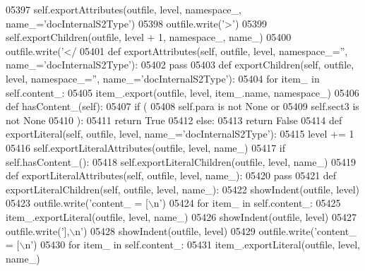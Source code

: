 \begin{DoxyCode}
{{{{{{{{{{{{{{{{{{{{{{{{{{{{{{{{{{{{{{{{{{{{{{{{{{{{{{{{{{{{{{{{{{{{{{{{{{{{{{{{{{{{{{{{{{{{{{{{{{{{{{{{{{{{{{{{{{{{{{{{{{{{{{{{{{{{{{{{{{{{{{{{{{{{{{{{{{{{{{{{{{{{{{{{{{{{{{{{{{{{{{{{{{{{{{{{{{{{{{{{{{{{{{{{{{{{{{{{{{{{{{{{{{{{{{{{{{{{{{{{{{{{{{{{{{{{{{{{{{{{{{{{{{{{{{{{{{{{{{{{{{{{{{{{{{{{{{{{{{{{{{{{{{{{{{{{{{{{{{{{{{{{{{{{{{{{{{{{{{{{{05397         self.exportAttributes(outfile, level, namespace\_, name\_=\textcolor{stringliteral}{'docInternalS2Type'})
05398         outfile.write(\textcolor{stringliteral}{'>'})
05399         self.exportChildren(outfile, level + 1, namespace\_, name\_)
05400         outfile.write(\textcolor{stringliteral}{'</%
05401     \textcolor{keyword}{def }exportAttributes(self, outfile, level, namespace\_='', name\_='docInternalS2Type'):
05402         \textcolor{keywordflow}{pass}
05403     \textcolor{keyword}{def }exportChildren(self, outfile, level, namespace\_='', name\_='docInternalS2Type'):
05404         \textcolor{keywordflow}{for} item\_ \textcolor{keywordflow}{in} self.content\_:
05405             item\_.export(outfile, level, item\_.name, namespace\_)
05406     \textcolor{keyword}{def }hasContent_(self):
05407         \textcolor{keywordflow}{if} (
05408             self.para \textcolor{keywordflow}{is} \textcolor{keywordflow}{not} \textcolor{keywordtype}{None} \textcolor{keywordflow}{or}
05409             self.sect3 \textcolor{keywordflow}{is} \textcolor{keywordflow}{not} \textcolor{keywordtype}{None}
05410             ):
05411             \textcolor{keywordflow}{return} \textcolor{keyword}{True}
05412         \textcolor{keywordflow}{else}:
05413             \textcolor{keywordflow}{return} \textcolor{keyword}{False}
05414     \textcolor{keyword}{def }exportLiteral(self, outfile, level, name\_='docInternalS2Type'):
05415         level += 1
05416         self.exportLiteralAttributes(outfile, level, name\_)
05417         \textcolor{keywordflow}{if} self.hasContent_():
05418             self.exportLiteralChildren(outfile, level, name\_)
05419     \textcolor{keyword}{def }exportLiteralAttributes(self, outfile, level, name\_):
05420         \textcolor{keywordflow}{pass}
05421     \textcolor{keyword}{def }exportLiteralChildren(self, outfile, level, name\_):
05422         showIndent(outfile, level)
05423         outfile.write(\textcolor{stringliteral}{'content\_ = [\(\backslash\)n'})
05424         \textcolor{keywordflow}{for} item\_ \textcolor{keywordflow}{in} self.content\_:
05425             item\_.exportLiteral(outfile, level, name\_)
05426         showIndent(outfile, level)
05427         outfile.write(\textcolor{stringliteral}{'],\(\backslash\)n'})
05428         showIndent(outfile, level)
05429         outfile.write(\textcolor{stringliteral}{'content\_ = [\(\backslash\)n'})
05430         \textcolor{keywordflow}{for} item\_ \textcolor{keywordflow}{in} self.content\_:
05431             item\_.exportLiteral(outfile, level, name\_)
}}}}}}}}}}}}}}}}}}}}}}}}}}}}}}}}}}}}}}}}}}}}}}}}}}}}}}}}}}}}}}}}}}}}}}}}}}}}}}}}}}}}}}}}}}}}}}}}}}}}}}}}}}}}}}}}}}}}}}}}}}}}}}}}}}}}}}}}}}}}}}}}}}}}}}}}}}}}}}}}}}}}}}}}}}}}}}}}}}}}}}}}}}}}}}}}}}}}}}}}}}}}}}}}}}}}}}}}}}}}}}}}}}}}}}}}}}}}}}}}}}}}}}}}}}}}}}}}}}}}}}}}}}}}}}}}}}}}}}}}}}}}}}}}}}}}}}}}}}}}}}}}}}}}}}}}}}}}}}}}}}}}}}}}}}}}}}}}}}}}}}
\end{DoxyCode}
